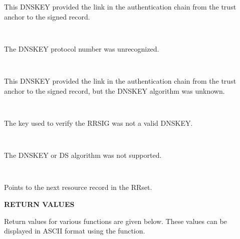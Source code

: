 \begin{description}
\begin{description}
\begin{description}
This DNSKEY provided the link in the authentication chain from the trust
anchor to the signed record.

\item {}\verb" "

The DNSKEY protocol number was unrecognized.

\item {}\verb" "

This DNSKEY provided the link in the authentication chain from the trust
anchor to the signed record, but the DNSKEY algorithm was unknown.

\item {}\verb" "

The key used to verify the RRSIG was not a valid DNSKEY.

\item {}\verb" "

The DNSKEY or DS algorithm was not supported.

\end{description}

\end{description}

\item {} \verb" "

Points to the next resource record in the RRset.

\end{description}

{\bf RETURN VALUES}

Return values for various functions are given below. These values can be
displayed in ASCII format using the  function.

